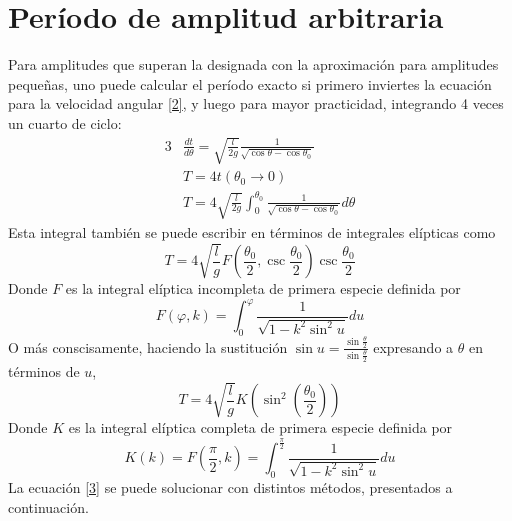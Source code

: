 \documentclass[12pt]{article}
\begin{document}
\section{Período de amplitud arbitraria}
Para amplitudes que superan la designada con la aproximación para amplitudes pequeñas, uno puede calcular el período exacto si primero inviertes la ecuación para la velocidad angular \eqref{2}, y luego para mayor practicidad, integrando 4 veces un cuarto de ciclo:
\begin{alignat}{3}
&\frac{dt}{d\theta}=\sqrt{\frac{l}{2g}}\frac{1}{\sqrt{\cos\theta-\cos\theta_0}} \\
&T=4t(\theta_0\to0)\\
&T=4\sqrt{\frac{l}{2g}}\int_{0}^{\theta_0} \frac{1}{\sqrt{\cos\theta-\cos\theta_0}}d\theta
\end{alignat}
Esta integral también se puede escribir en términos de integrales elípticas como
\begin{equation}
T=4\sqrt{\frac{l}{g}}F\left(\frac{\theta_0}{2},\csc{\frac{\theta_0}{2}}\right) \csc{\frac{\theta_0}{2}}
\end{equation}
Donde $F$ es la integral elíptica incompleta de primera especie definida por
\begin{equation}
F(\varphi,k)=\int_0^\varphi \frac{1}{\sqrt{1-k^2\sin^2u}} du
\end{equation}
O más conscisamente, haciendo la sustitución $\displaystyle\sin u = \frac{\sin{\frac{\theta}{2}}}{\sin{\frac{\theta}{2}}}$ expresando a $\theta$ en términos de $u$,
\begin{equation}\label{3}
T=4\sqrt{\frac{l}{g}}K\left(\sin^2\left(\frac{\theta_0}{2}\right)\right)
\end{equation}
Donde $K$ es la integral elíptica completa de primera especie definida por
\begin{equation}
K(k)=F\left(\frac{\pi}{2},k\right)=\int_{0}^{\frac{\pi}{2}} \frac{1}{\sqrt{1-k^2\sin^2u}} du
\end{equation}
La ecuación \eqref{3} se puede solucionar con distintos métodos, presentados a continuación.
\end{document}
